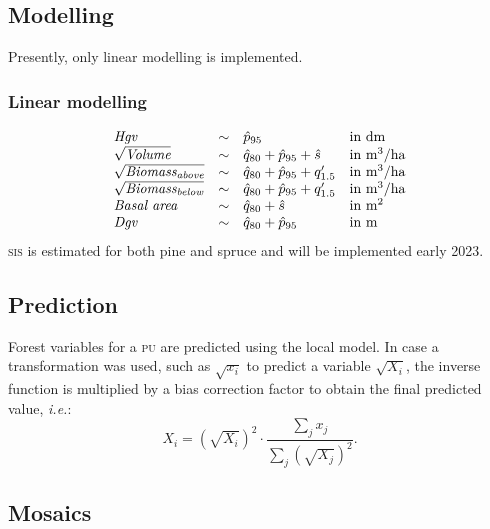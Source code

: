 \documentclass[english,a4paper,minion,nofigsidecaption]{article}
\providecommand{\ie}{\textit{i.e.}}
\providecommand{\abbr}[1]{\texorpdfstring{\textsc{\MakeLowercase{#1}}}{#1}}
\newcommand{\slu}{\abbr{SLU}}
\newcommand{\pu}{\abbr{PU}}
\newcommand{\first}[1]{\ensuremath{\hat{#1}}}
\newcommand{\perc}[1]{\ensuremath{\first{p}_{#1}}}
\newcommand{\stdf}{\ensuremath{\first{s}}}
\newcommand{\hveg}[1]{\ensuremath{\first{q}_{#1}}}
\newcommand{\prop}[1]{\ensuremath{q'_{#1}}}
\newcommand{\sis}{\abbr{SIS}}%
\newcommand{\wet}{\ensuremath{w_\textrm{\slu}}}%
\begin{document}
\subsection{Modelling}

Presently, only linear modelling is implemented. 


\subsubsection{Linear modelling}

$$
	\begin{array}{l@{\quad\sim\quad}l@{\quad}l}
		\textit{Hgv}							& 				\perc{95}				& \textrm{in dm}				\\
		\sqrt{\textit{Volume}}					& \hveg{80} +	\perc{95} +	\stdf		& \textrm{in m}^3/\textrm{ha}	\\
		\sqrt{\textit{Biomass}_\textit{above}}	& \hveg{80} +	\perc{95} +	\prop{1.5}	& \textrm{in m}^3/\textrm{ha}	\\
		\sqrt{\textit{Biomass}_\textit{below}}	& \hveg{80} +	\perc{95} +	\prop{1.5}	& \textrm{in m}^3/\textrm{ha}	\\
		\textit{Basal area}						& \hveg{80} +				\stdf		& \textrm{in m}^2				\\
		\textit{Dgv}							& \hveg{80}	+	\perc{95} 				& \textrm{in m}					\\
	\end{array}
$$
{\sis} is estimated for both pine and spruce and will be implemented early 2023. 



\subsection{Prediction}

Forest variables for a {\pu} are predicted using the local model. In case a transformation was used, such as $\sqrt{x_i}$ to predict a variable $\sqrt{X_i}$, the inverse function is multiplied by a bias correction factor to obtain the final predicted value, \ie:
$$
	X_i = \left(\sqrt{X_i}\right)^2 \cdot \frac{\sum_j x_j}{\sum_j \left(\sqrt{X_j}\right)^2}.
$$



\subsection{Mosaics}
\end{document}
